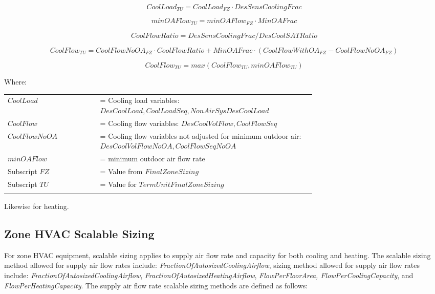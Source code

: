 \begin{equation}
    {CoolLoad_{TU}} = {CoolLoad_{FZ}} \cdot {DesSensCoolingFrac}
\end{equation}

\begin{equation}
    {minOAFlow_{TU}} = {minOAFlow_{FZ}} \cdot {MinOAFrac}
\end{equation}

\begin{equation}
    {CoolFlowRatio} = {DesSensCoolingFrac} / {DesCoolSATRatio}
\end{equation}

{\scriptsize
\begin{equation}
    {CoolFlow_{TU}} = {CoolFlowNoOA_{FZ}} \cdot CoolFlowRatio + {MinOAFrac} \cdot ( {CoolFlowWithOA_{FZ}} - {CoolFlowNoOA_{FZ}} ) 
\end{equation}}

\begin{equation}
    {CoolFlow_{TU}} = max({CoolFlow_{TU}},{minOAFlow_{TU}}) 
\end{equation}

Where:

\begin{tabular}{lp{0.7\linewidth}}
\\
    $CoolLoad$ &= Cooling load variables: $DesCoolLoad, CoolLoadSeq, NonAirSysDesCoolLoad$\\
    $CoolFlow$ &= Cooling flow variables: $DesCoolVolFlow, CoolFlowSeq$\\
    $CoolFlowNoOA$ &= Cooling flow variables not adjusted for minimum outdoor air: $DesCoolVolFlowNoOA, CoolFlowSeqNoOA$\\
    $minOAFlow$ &= minimum outdoor air flow rate\\
    Subscript $FZ$ &= Value from $FinalZoneSizing$\\
    Subscript $TU$ &= Value for $TermUnitFinalZoneSizing$\\
\\
\end{tabular}

Likewise for heating.

\subsection{Zone HVAC Scalable Sizing}\label{zone-hvac-scalable-sizing}

For zone HVAC equipment, scalable sizing applies to supply air flow rate and capacity for both cooling and heating. The scalable sizing method allowed for supply air flow rates include: \emph{FractionOfAutosizedCoolingAirflow}, sizing method allowed for supply air flow rates include: \emph{FractionOfAutosizedCoolingAirflow}, \emph{FractionOfAutosizedHeatingAirflow}, \emph{FlowPerFloorArea, FlowPerCoolingCapacity}, and \emph{FlowPerHeatingCapacity}. The supply air flow rate scalable sizing methods are defined as follows:

